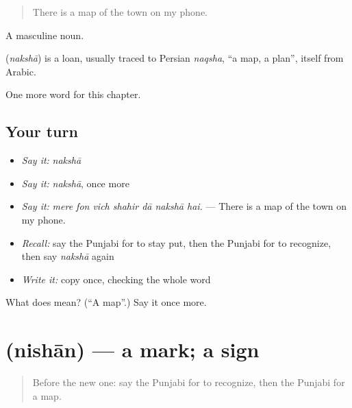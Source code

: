\begin{quote}
There is a map of the town on my phone.
\end{quote}

A masculine noun.

\begin{cousinweb}
\textbf{} (\emph{nakshā}) is a loan, usually traced to Persian \emph{naqsha}, \textquotedblleft{}a map, a plan\textquotedblright{}, itself from Arabic.
\end{cousinweb}

\begin{grammarlens}[title={What you've built}]
One more word for this chapter.
\end{grammarlens}

\subsection*{Your turn}
\begin{itemize}
\raggedright
  \item \emph{Say it:} \emph{nakshā}
  \item \emph{Say it:} \emph{nakshā}, once more
  \item \emph{Say it:} \emph{mere fon vich shahir dā nakshā hai.} — There is a map of the town on my phone.
  \item \emph{Recall:} say the Punjabi for to stay put, then the Punjabi for to recognize, then say \emph{nakshā} again
  \item \emph{Write it:} copy \textbf{} once, checking the whole word
\end{itemize}

\begin{tcolorbox}[breakable,colback=teal!4,colframe=teal!35!black,title={Before you move on}]
What does  mean? (\textquotedblleft{}A map\textquotedblright{}.) Say it once more.
\end{tcolorbox}
\section[\texorpdfstring{\pa{ਨਿਸ਼ਾਨ} (nishān)}{ਨਿਸ਼ਾਨ (nishān)}]{ (nishān) — a mark; a sign}

\label{lesson:PA-C269-nishan}



\begin{quote}
Before the new one: say the Punjabi for to recognize, then the Punjabi for a map.
\end{quote}

